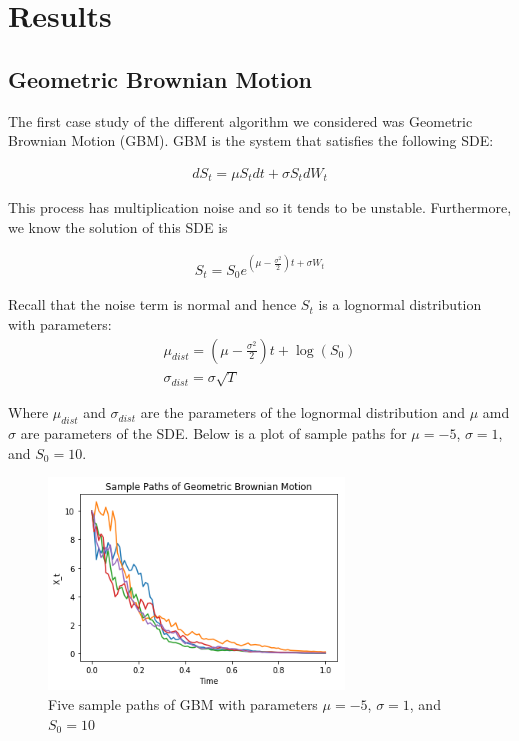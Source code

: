 \documentclass[onecolumn,notitlepage,pra,10pt,aps]{revtex4-1}
\begin{document}
\section{Results}
  \subsection{Geometric Brownian Motion}
  The first case study of the different algorithm we considered was Geometric Brownian Motion (GBM). GBM is the system that satisfies the following SDE:

  \begin{gather*}
    d S_t = \mu S_t dt + \sigma S_t d W_t
  \end{gather*}

  This process has multiplication noise and so it tends to be unstable. Furthermore, we know the solution of this SDE is

  \begin{gather*}
    S_t = S_0 e^{(\mu - \frac{\sigma^2}{2})t + \sigma W_t}
  \end{gather*}

  Recall that the noise term is normal and hence $S_t$ is a lognormal distribution with parameters:
  \begin{gather*}
    \mu_{dist} = (\mu - \frac{\sigma^2}{2})t + \log(S_0) \\
    \sigma_{dist} = \sigma \sqrt{T}
  \end{gather*}

  Where $\mu_{dist}$ and $\sigma_{dist}$ are the parameters of the lognormal distribution and $\mu$ amd $\sigma$ are parameters of the SDE. Below is a plot of sample paths for $\mu = -5$, $\sigma = 1$, and $S_0 = 10$.

  \begin{figure}[H]
    \centering
      \includegraphics[width=0.7\textwidth]{sample_paths_gbm.png}
    \caption{Five sample paths of GBM with parameters $\mu = -5$, $\sigma = 1$, and $S_0 = 10$}
  \end{figure}
\end{document}
